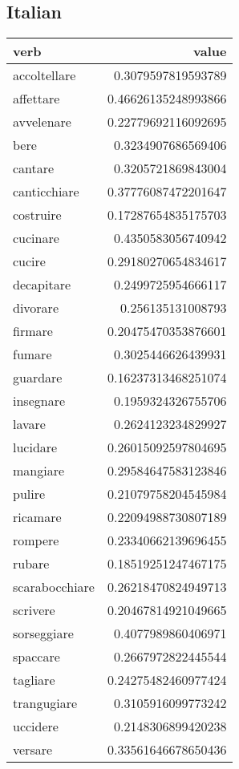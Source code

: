 \subsection{Italian}

\begin{longtable}{l|r}
\textbf{verb}     & \textbf{value}    \\
\hline
\endhead
accoltellare   & 0.3079597819593789  \\
affettare      & 0.46626135248993866 \\
avvelenare     & 0.22779692116092695 \\
bere           & 0.3234907686569406  \\
cantare        & 0.3205721869843004  \\
canticchiare   & 0.37776087472201647 \\
costruire      & 0.17287654835175703 \\
cucinare       & 0.4350583056740942  \\
cucire         & 0.29180270654834617 \\
decapitare     & 0.2499725954666117  \\
divorare       & 0.256135131008793   \\
firmare        & 0.20475470353876601 \\
fumare         & 0.3025446626439931  \\
guardare       & 0.16237313468251074 \\
insegnare      & 0.1959324326755706  \\
lavare         & 0.2624123234829927  \\
lucidare       & 0.26015092597804695 \\
mangiare       & 0.29584647583123846 \\
pulire         & 0.21079758204545984 \\
ricamare       & 0.22094988730807189 \\
rompere        & 0.23340662139696455 \\
rubare         & 0.18519251247467175 \\
scarabocchiare & 0.26218470824949713 \\
scrivere       & 0.20467814921049665 \\
sorseggiare    & 0.4077989860406971  \\
spaccare       & 0.2667972822445544  \\
tagliare       & 0.24275482460977424 \\
trangugiare    & 0.3105916099773242  \\
uccidere       & 0.2148306899420238  \\
versare        & 0.33561646678650436
\end{longtable}




